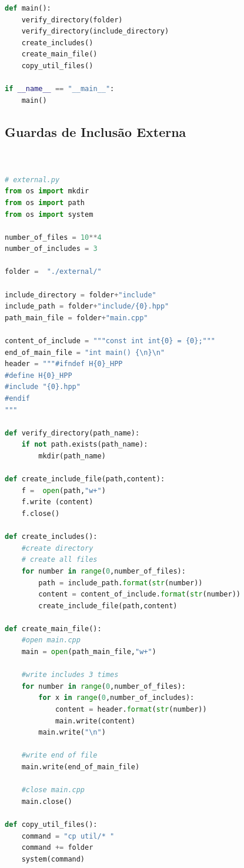 \begin{apendicesenv}
\begin{lstlisting}[language=Python, caption={
     Script Guardas de Inclusão Externa mais pragma once},
                  label=script_external_pragma_include]
def main():
    verify_directory(folder)
    verify_directory(include_directory)
    create_includes()
    create_main_file()
    copy_util_files()

if __name__ == "__main__":
    main()
\end{lstlisting}

\subsection{Guardas de Inclusão Externa}
\begin{lstlisting}[language=Python,caption={
            Script Guardas de Inclusão Externa },
                   label=script_external_include]
                   
                   
# external.py
from os import mkdir
from os import path
from os import system

number_of_files = 10**4
number_of_includes = 3

folder =  "./external/"

include_directory = folder+"include"
include_path = folder+"include/{0}.hpp"
path_main_file = folder+"main.cpp"

content_of_include = """const int int{0} = {0};"""
end_of_main_file = "int main() {\n}\n"
header = """#ifndef H{0}_HPP
#define H{0}_HPP
#include "{0}.hpp"
#endif
"""

def verify_directory(path_name):
    if not path.exists(path_name):
        mkdir(path_name)

def create_include_file(path,content):
    f =  open(path,"w+")
    f.write (content)
    f.close()

def create_includes():
    #create directory
    # create all files
    for number in range(0,number_of_files):
        path = include_path.format(str(number))
        content = content_of_include.format(str(number))
        create_include_file(path,content)
    
def create_main_file():
    #open main.cpp
    main = open(path_main_file,"w+")

    #write includes 3 times
    for number in range(0,number_of_files):
        for x in range(0,number_of_includes):
            content = header.format(str(number))
            main.write(content)
        main.write("\n")

    #write end of file
    main.write(end_of_main_file)

    #close main.cpp
    main.close()

def copy_util_files():
    command = "cp util/* "
    command += folder
    system(command)
    


\end{lstlisting}
\end{apendicesenv}
